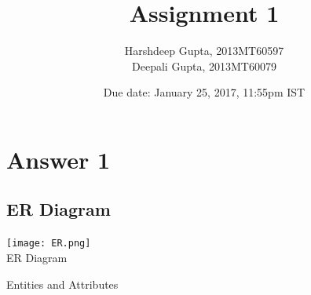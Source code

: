 \documentclass[10pt]{article}
\title{Assignment 1}
\author {Harshdeep Gupta, 2013MT60597\\Deepali Gupta, 2013MT60079}
\date{Due date: January 25, 2017, 11:55pm IST}
\begin{document}
\maketitle

\section{Answer 1}
\subsection{ER Diagram}
 \begin{center}
\texttt{[image: ER.png]}{\\ER Diagram}
\end{center}
\begin{table}[h!]
  \centering
  \caption{Entities and Attributes}
  \label{tab:table1}
  \vspace{5mm}
 

\end{table}
\end{document}
